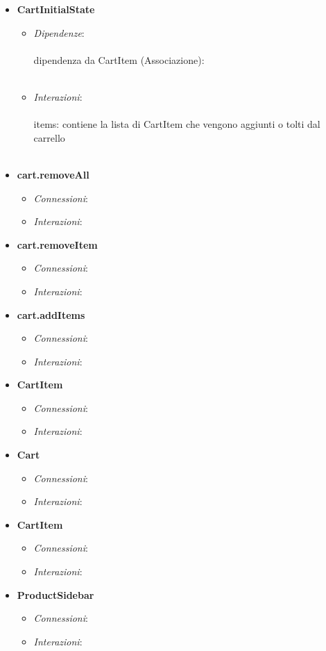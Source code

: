 \begin{itemize}
\begin{itemize}
			\\\\
		\end{itemize}
		\item \textbf{CartInitialState}
		\begin{itemize}
			\item \textit{Dipendenze}: 
			\\\\
			dipendenza da CartItem (Associazione):
			\\\\
			\item \textit{Interazioni}:
			\\\\
			items: contiene la lista di CartItem che vengono aggiunti o tolti dal carrello
			\\\\
		\end{itemize} 
		\item \textbf{cart.removeAll}
		\begin{itemize}
			\item \textit{Connessioni}:
			\item \textit{Interazioni}:
		\end{itemize} 
		\item \textbf{cart.removeItem}
		\begin{itemize}
			\item \textit{Connessioni}:
			\item \textit{Interazioni}:
		\end{itemize} 
		\item \textbf{cart.addItems}
		\begin{itemize}
			\item \textit{Connessioni}:
			\item \textit{Interazioni}:
		\end{itemize} 	
		\item \textbf{CartItem}
		\begin{itemize}
			\item \textit{Connessioni}:
			\item \textit{Interazioni}:
		\end{itemize} 
		\item \textbf{Cart}
		\begin{itemize}
			\item \textit{Connessioni}:
			\item \textit{Interazioni}:
		\end{itemize} 
		\item \textbf{CartItem}
		\begin{itemize}
			\item \textit{Connessioni}:
			\item \textit{Interazioni}:
		\end{itemize} 
		\item \textbf{ProductSidebar}
		\begin{itemize}
			\item \textit{Connessioni}:
			\item \textit{Interazioni}:
		\end{itemize} 
	\end{itemize}
	
